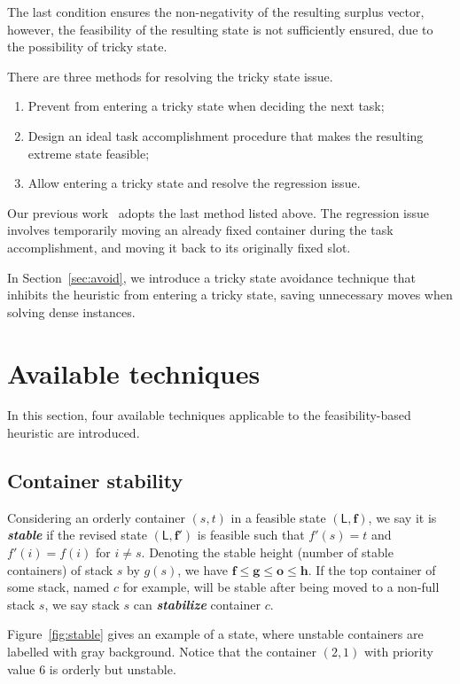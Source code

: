 \documentclass[review,3p,times,12pt,number]{elsarticle}\usepackage{amsmath}\usepackage{amssymb}
\renewcommand{\emph}[1]{\textbf{\textit{#1}}}
\begin{document}
The last condition ensures the non-negativity of the resulting surplus vector, however, the feasibility of the resulting state is not sufficiently ensured, due to the possibility of tricky state.

There are three methods for resolving the tricky state issue.
\begin{enumerate}
\item Prevent from entering a tricky state when deciding the next task;
\item Design an ideal task accomplishment procedure that makes the resulting extreme state feasible;
\item Allow entering a tricky state and resolve the regression issue.
\end{enumerate}

Our previous work~\citep{wang2015} adopts the last method listed above. The regression issue involves temporarily moving an already fixed container during the task accomplishment, and moving it back to its originally fixed slot.

In Section~\ref{sec:avoid}, we introduce a tricky state avoidance technique that inhibits  the heuristic from entering a tricky state, saving unnecessary moves when solving dense instances.



\section{Available techniques}
\label{sec:technique}
In this section, four available techniques applicable to the feasibility-based heuristic are introduced.

\subsection{Container stability}

Considering an orderly container $(s,t)$ in a feasible state $(\mathsf{L},\boldsymbol{f})$, we say it is \emph{stable} if the revised state $(\mathsf{L},\boldsymbol{f}')$ is feasible such that $f'(s)=t$ and $f'(i)=f(i)$ for $i\neq s$. Denoting the stable height (number of stable containers) of stack $s$ by $ g(s)$, we have $\boldsymbol{f}\le \boldsymbol{ g}\le \boldsymbol{o}\le \boldsymbol{h}$. If the top container of some stack, named $c$ for example, will be stable after being moved to a non-full stack $s$, we say stack $s$ can \emph{stabilize} container $c$. 

Figure~\ref{fig:stable} gives an example of a state, where unstable containers are labelled with gray background. Notice that the container $(2,1)$ with priority value $6$ is orderly but unstable.
\end{document}
